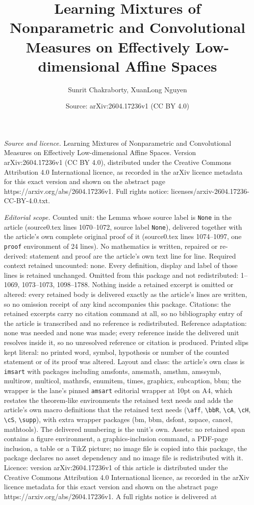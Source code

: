 \documentclass[10pt,a4paper]{amsart}
\title[Learning Mixtures of Nonparametric and Convolutional Measure]{Learning Mixtures of Nonparametric and Convolutional Measures on Effectively Low-dimensional Affine Spaces}
\author{Sunrit Chakraborty, XuanLong Nguyen}
\date{Source: arXiv:2604.17236v1 (CC BY 4.0)}
\begin{document}
\maketitle

\noindent\emph{Source and licence.} Learning Mixtures of Nonparametric and Convolutional Measures on Effectively Low-dimensional Affine Spaces. Version arXiv:2604.17236v1 (CC BY 4.0), distributed under the Creative Commons Attribution 4.0 International licence, as recorded in the arXiv licence metadata for this exact version and shown on the abstract page https://arxiv.org/abs/2604.17236v1. Full rights notice: licenses/arxiv-2604.17236-CC-BY-4.0.txt.\par\smallskip

\noindent\textit{Editorial scope.} Counted unit: the Lemma whose source label is \texttt{None} in the article (source0.tex lines 1070--1072, source label \texttt{None}), delivered together with the article's own complete original proof of it (source0.tex lines 1074--1097, one \texttt{proof} environment of 24 lines). No mathematics is written, repaired or re-derived: statement and proof are the article's own text line for line. Required context retained uncounted: none. Every definition, display and label of those lines is retained unchanged. Omitted from this package and not redistributed: 1--1069, 1073--1073, 1098--1788. Nothing inside a retained excerpt is omitted or altered: every retained body is delivered exactly as the article's lines are written, so no omission receipt of any kind accompanies this package. Citations: the retained excerpts carry no citation command at all, so no bibliography entry of the article is transcribed and no reference is redistributed. Reference adaptation: none was needed and none was made; every reference inside the delivered unit resolves inside it, so no unresolved reference or citation is produced. Printed slips kept literal: no printed word, symbol, hypothesis or number of the counted statement or of its proof was altered. Layout and class: the article's own class is \texttt{imsart} with packages including amsfonts, amsmath, amsthm, amssymb, multirow, multicol, mathrsfs, enumitem, times, graphicx, subcaption, bbm; the wrapper is the lane's pinned \texttt{amsart} editorial wrapper at 10pt on A4, which restates the theorem-like environments the retained text needs and adds the article's own macro definitions that the retained text needs (\texttt{\textbackslash aff}, \texttt{\textbackslash bbR}, \texttt{\textbackslash cA}, \texttt{\textbackslash cH}, \texttt{\textbackslash cS}, \texttt{\textbackslash supp}), with extra wrapper packages (bm, bbm, dsfont, xspace, cancel, mathtools). The delivered numbering is the unit's own. Assets: no retained span contains a figure environment, a graphics-inclusion command, a PDF-page inclusion, a table or a TikZ picture; no image file is copied into this package, the package declares no asset dependency and no image file is redistributed with it. Licence: version arXiv:2604.17236v1 of this article is distributed under the Creative Commons Attribution 4.0 International licence, as recorded in the arXiv licence metadata for this exact version and shown on the abstract page https://arxiv.org/abs/2604.17236v1. A full rights notice is delivered at 
\end{document}
